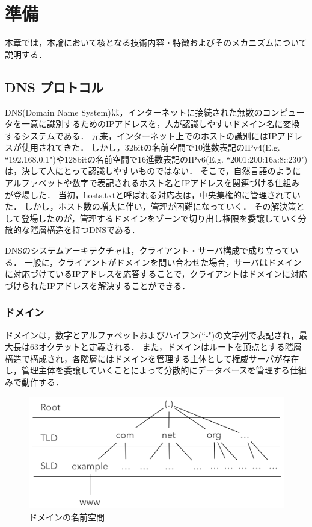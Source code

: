 \section{準備}
本章では，本論において核となる技術内容・特徴およびそのメカニズムについて説明する．
\subsection{DNS プロトコル}
\label{sec:dns-protocol}
DNS(Domain Name System)は，インターネットに接続された無数のコンピュータを一意に識別するためのIPアドレスを，人が認識しやすいドメイン名に変換するシステムである．
元来，インターネット上でのホストの識別にはIPアドレスが使用されてきた．
しかし，32bitの名前空間で10進数表記のIPv4(E.g. ``192.168.0.1")や128bitの名前空間で16進数表記のIPv6(E.g. ``2001:200:16a:8::230")は，決して人にとって認識しやすいものではない．
そこで，自然言語のようにアルファベットや数字で表記されるホスト名とIPアドレスを関連づける仕組みが登場した．
当初，hosts.txtと呼ばれる対応表は，中央集権的に管理されていた．
しかし，ホスト数の増大に伴い，管理が困難になっていく．
その解決策として登場したのが，管理するドメインをゾーンで切り出し権限を委譲していく分散的な階層構造を持つDNSである．

DNSのシステムアーキテクチャは，クライアント・サーバ構成で成り立っている．
一般に，クライアントがドメインを問い合わせた場合，サーバはドメインに対応づけているIPアドレスを応答することで，クライアントはドメインに対応づけられたIPアドレスを解決することができる．

\subsubsection{ドメイン}
ドメインは，数字とアルファベットおよびハイフン(``-")の文字列で表記され，最大長は63オクテットと定義される．
また，ドメインはルートを頂点とする階層構造で構成され，各階層にはドメインを管理する主体として権威サーバが存在し，管理主体を委譲していくことによって分散的にデータベースを管理する仕組みで動作する．

\begin{figure}[h]
 \centering
 \includegraphics[width=12.0cm]{figure/dns-architecture.png}
 \caption{ドメインの名前空間}
 \label{fig:dns-architecture}
\end{figure}

